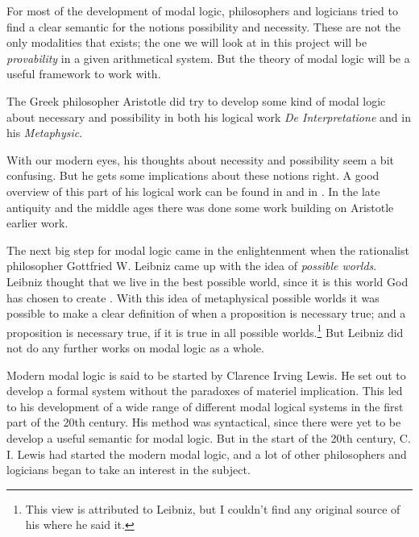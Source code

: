 \documentclass[../main.tex]{subfiles}
\begin{document}
For most of the development of modal logic, philosophers and logicians tried to
find a clear semantic for the notions possibility and necessity. These are not
the only modalities that exists; the one we will look at in this project will
be \textit{provability} in a given arithmetical system. But the theory of modal logic
will be a useful framework to work with.

The Greek philosopher Aristotle did try to develop some kind of modal logic
about necessary and possibility in both his logical work \textit{De
Interpretatione} and in his
 \textit{Metaphysic}.

With our modern eyes, his thoughts about necessity  and possibility seem a
bit confusing. But he gets some implications about these notions right. A good
overview of this part of his logical work can be found in \citet{Lemmon1977} and
in \citet{Luka1957}.
In the late antiquity and the middle ages there was done some work building on 
Aristotle earlier work. 

The next big step for modal logic came in the enlightenment when the
rationalist philosopher Gottfried W. Leibniz came up with the idea of \textit{possible
worlds}.  Leibniz thought that we live in the best possible world, since it is
this world God has chosen to create \parencite{Leibniz1760}. With this idea of metaphysical possible
worlds it was possible to make a clear definition of when a proposition is
necessary true; and a proposition is necessary true, if it is true in all
possible worlds.\footnote{This view is attributed to Leibniz, but I couldn't
find any original source of his where he said it.}
But Leibniz did not do any further works on modal logic as a
whole.

Modern modal logic is said to be started by Clarence Irving Lewis. He set out
to develop a formal system without the paradoxes of materiel
implication. This led to his development of a wide range of different modal
logical systems in the first part of the 20th century. His method was
syntactical, since there were yet to be develop a useful semantic for modal
logic. But in the start of the 20th century, C. I. Lewis had started the modern
modal logic, and a lot of other philosophers and logicians began to take an
interest in the subject.
\end{document}
